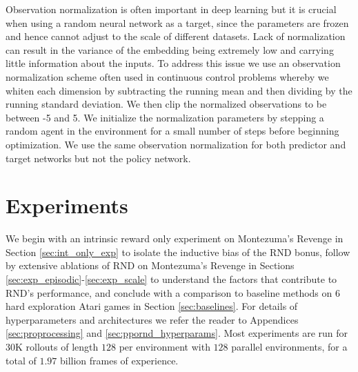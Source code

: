 \documentclass{article} \usepackage[dvipsnames]{xcolor}
\begin{document}
Observation normalization is often important in deep learning but it is  crucial when using a random neural network as a target, since the parameters are frozen and hence cannot adjust to the scale of different datasets. Lack of normalization can result in the variance of the embedding being extremely low and carrying little information about the inputs. To address this issue we use an observation normalization scheme often used in continuous control problems whereby we whiten each dimension by subtracting the running mean and then dividing by the running standard deviation. We then clip the normalized observations to be between -5 and 5. We initialize the normalization parameters by stepping a random agent in the environment for a small number of steps before beginning optimization. We use the same observation normalization for both predictor and target networks but not the policy network.

\section{Experiments}
We begin with an intrinsic reward only experiment on Montezuma's Revenge in Section \ref{sec:int_only_exp} to isolate the inductive bias of the RND bonus, follow by extensive ablations of RND on Montezuma's Revenge in Sections \ref{sec:exp_episodic}-\ref{sec:exp_scale} to understand the factors that contribute to RND's performance, and conclude with a comparison to baseline methods on 6 hard exploration Atari games in Section \ref{sec:baselines}. For details of hyperparameters and architectures we refer the reader to Appendices \ref{sec:proprocessing} and \ref{sec:ppornd_hyperparams}. Most experiments are run for 30K rollouts of length $128$ per environment with $128$ parallel environments, for a total of $1.97$ billion frames of experience. 
\end{document}
